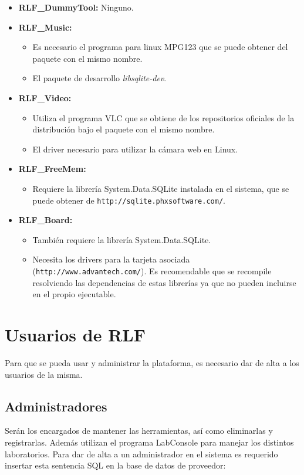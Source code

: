 \begin{itemize}
\item \textbf{RLF\_DummyTool:} Ninguno.
\item \textbf{RLF\_Music:}
	\begin{itemize}
	\item Es necesario el programa para linux MPG123 que se puede 
	obtener del paquete con el mismo nombre.
	\item El paquete de desarrollo \emph{libsqlite-dev}.
	\end{itemize}
\item \textbf{RLF\_Video:}
	\begin{itemize}
	\item Utiliza el programa VLC que se obtiene de los repositorios 
	oficiales de la distribución bajo el paquete con el mismo nombre.
	\item El driver necesario para utilizar la cámara web en Linux.
	\end{itemize}
\item \textbf{RLF\_FreeMem:}
	\begin{itemize}
	\item Requiere la librería System.Data.SQLite instalada en el 
	sistema, que se puede obtener de 
	\texttt{http://sqlite.phxsoftware.com/}.
	\end{itemize}
\item \textbf{RLF\_Board:}
	\begin{itemize}
	\item También requiere la librería System.Data.SQLite.
	\item Necesita los drivers para la tarjeta asociada 
	(\texttt{http://www.advantech.com/}). Es recomendable 
	que se recompile resolviendo las dependencias de estas librerías 
	ya que no pueden incluirse en el propio ejecutable.
	\end{itemize}
\end{itemize}

\section*{Usuarios de RLF}
Para que se pueda usar y administrar la plataforma, es necesario dar 
de alta a los usuarios de la misma.

\subsection*{Administradores}
Serán los encargados de mantener las herramientas, así como 
eliminarlas y registrarlas. Además utilizan el programa LabConsole 
para manejar los distintos laboratorios. Para dar de alta a un 
administrador en el sistema es requerido insertar esta sentencia SQL 
en la base de datos de proveedor:

